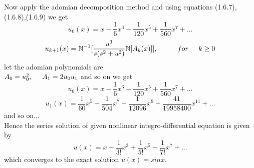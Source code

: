 Now apply the adomian decomposition method and using equations (1.6.7),(1.6.8),(1.6.9) we get
\begin{equation}
u_{0}(x) = x - \frac{1}{6}x^3 - \frac{1}{120}x^5 + \frac{1}{560}x^7 + ...    
\end{equation}
\begin{equation}
  { u_{k+1}(x) = \mathbb{N}^{-1}[\frac{u^3}{s(s^2+u^2)}\mathbb{N}[A_{k}(x)]] , {\hspace{1 cm}} for{\hspace{0.5 cm}} k\geq 0}
   \end{equation}
   let the adomian polynomials are\\
 $ A_{0} = u_{0}^2  ,{\hspace{0.5 cm}} A_{1} = 2 u_{0}u_{1} $ and so on we get
\begin{equation}
u_{0}(x) = x - \frac{1}{6}x^3 - \frac{1}{120}x^5 + \frac{1}{560}x^7 + ...    
\end{equation}
\begin{equation}
u_{1}(x) =  \frac{1}{60}x^5 - \frac{1}{504}x^7 + \frac{1}{12096}x^9 + \frac{41}{19958400}x^{11} + ...    
\end{equation}
and so on...\\
Hence the series solution of given nonlinear integro-differential equation is given by
\begin{equation}
u(x) = x - \frac{1}{3!}x^3 + \frac{1}{5!}x^5 - \frac{1}{7!}x^7 + ...
\end{equation}
which converges to the exact solution $ u(x) = sinx $.

